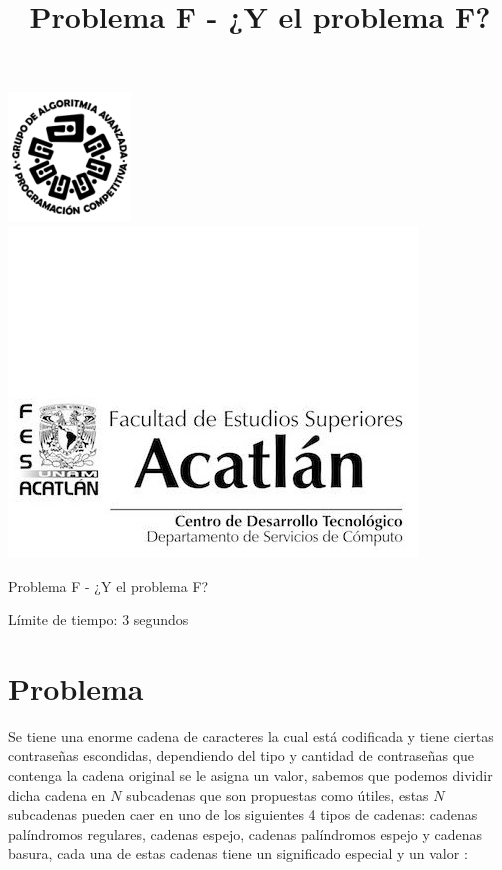 \documentclass[letter,10pt]{article}
\date{}
\begin{document}
\title{Problema F - ¿Y el problema F?}

\includegraphics[scale=0.6]{logo} \hspace*{9.00cm}
\includegraphics[scale=0.5]{dsc} 
\bigskip
\begin{center}
	\Large Problema F - ¿Y el problema F?
\end{center}

\begin{flushright}
Límite de tiempo: 3 segundos
\par\end{flushright}
\bigskip

\section*{Problema}

Se tiene una enorme cadena de caracteres la cual está codificada y tiene ciertas contraseñas escondidas, dependiendo del tipo y cantidad de contraseñas que contenga la cadena original se le asigna un valor, sabemos que podemos dividir dicha cadena en $N$ subcadenas que son propuestas como útiles, estas $N$ subcadenas pueden caer en uno de los siguientes 4 tipos de cadenas: cadenas palíndromos regulares, cadenas espejo, cadenas palíndromos espejo y cadenas basura, cada una de estas cadenas tiene un significado especial y un valor :
\end{document}
